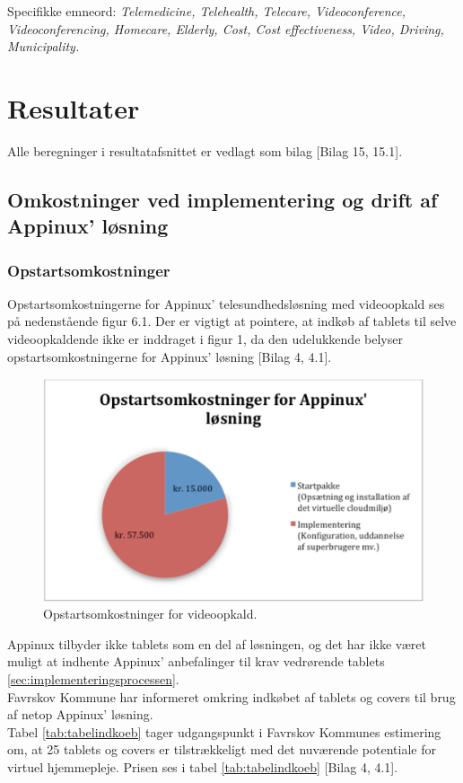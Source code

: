 Specifikke emneord: \textit{Telemedicine, Telehealth, Telecare, Videoconference, Videoconferencing, Homecare, Elderly, Cost, Cost effectiveness, Video, Driving, Municipality.}
  


\section{Resultater}
Alle beregninger i resultatafsnittet er vedlagt som bilag [Bilag 15, 15.1]. 
\subsection{Omkostninger ved implementering og drift af Appinux' løsning}
\subsubsection{Opstartsomkostninger}
Opstartsomkostningerne for Appinux’ telesundhedsløsning med videoopkald ses på nedenstående figur 6.1. Der er vigtigt at pointere, at indkøb af tablets til selve videoopkaldende ikke er inddraget i figur 1, da den udelukkende belyser opstartsomkostningerne for Appinux’ løsning [Bilag 4, 4.1].

\begin{figure}[H]
	\centering
	\includegraphics[width=1\textwidth]{Figurer/Skarmbillede_opstart}
	\caption{Opstartsomkostninger for videoopkald.}
\end{figure}

Appinux tilbyder ikke tablets som en del af løsningen, og det har ikke været muligt at indhente Appinux' anbefalinger til krav vedrørende tablets \vref{sec:implementeringsprocessen}.\\
Favrskov Kommune har informeret omkring indkøbet af tablets og covers til brug af netop Appinux’ løsning. \\
Tabel \ref{tab:tabelindkoeb} tager udgangspunkt i Favrskov Kommunes estimering om, at 25 tablets og covers er tilstrækkeligt med det nuværende potentiale for virtuel hjemmepleje. Prisen ses i tabel \ref{tab:tabelindkoeb} [Bilag 4, 4.1]. 

